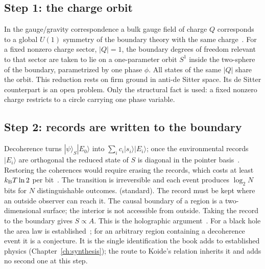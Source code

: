 \subsection{Step 1: the charge orbit}
In the gauge/gravity correspondence a bulk gauge field of charge $Q$ corresponds to a global $U(1)$ symmetry of the boundary theory with the same
charge~\cite{Maldacena1999}. For a fixed nonzero charge sector, $|Q|=1$, the boundary degrees of freedom relevant to that sector are taken to lie on
a one-parameter orbit $S^1$ inside the two-sphere of the boundary, parametrized by one phase $\phi$. All states of the same $|Q|$ share the orbit.
This reduction rests on firm ground in anti-de Sitter space. Its de Sitter counterpart is an open problem. \conjecture{} Only the structural fact
is used: a fixed nonzero charge restricts to a circle carrying one phase variable.

\subsection{Step 2: records are written to the boundary}
Decoherence turns $|\psi\rangle_S|E_0\rangle$ into $\sum_ic_i|s_i\rangle|E_i\rangle$; once the environmental records $|E_i\rangle$ are orthogonal the
reduced state of $S$ is diagonal in the pointer basis~\cite{Zurek2003}. Restoring the coherences would require erasing the records, which costs at
least $k_{\mathrm B} T\ln2$ per bit~\cite{Landauer1961}. The transition is irreversible and each event produces $\log_2N$ bits for $N$ distinguishable
outcomes. \derived{} (standard). The record must be kept where an outside observer can reach it. The causal boundary of a region is a
two-dimensional surface; the interior is not accessible from outside. Taking the record to the boundary gives $S\propto A$. This is the holographic
argument~\cite{tHooft1993,Susskind1995}. For a black hole the area law is established~\cite{Bekenstein1973,Hawking1975}; for an arbitrary region
containing a decoherence event it is a conjecture. \conjecture{} It is the single identification the book adds to established physics
(Chapter~\ref{ch:synthesis}); the route to Koide's relation inherits it and adds no second one at this step. \interp

